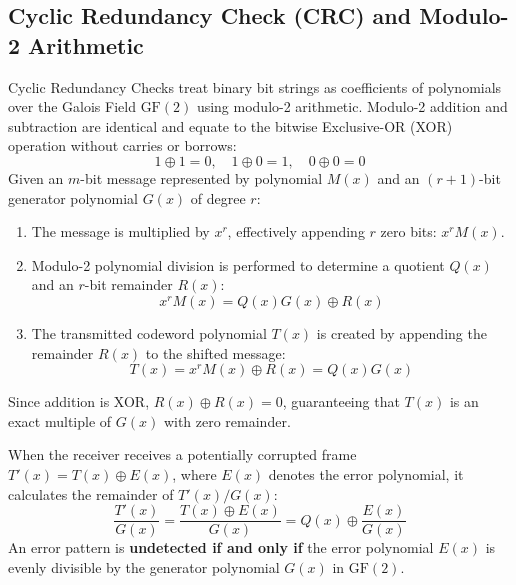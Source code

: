 \documentclass[11pt,a4paper]{article}
\begin{document}
\subsection{Cyclic Redundancy Check (CRC) and Modulo-2 Arithmetic}

Cyclic Redundancy Checks treat binary bit strings as coefficients of polynomials over the Galois Field $\text{GF}(2)$ using modulo-2 arithmetic. Modulo-2 addition and subtraction are identical and equate to the bitwise Exclusive-OR (XOR) operation without carries or borrows:
\begin{equation}
    1 \oplus 1 = 0, \quad 1 \oplus 0 = 1, \quad 0 \oplus 0 = 0
\end{equation}
Given an $m$-bit message represented by polynomial $M(x)$ and an $(r+1)$-bit generator polynomial $G(x)$ of degree $r$:
\begin{enumerate}
    \item The message is multiplied by $x^r$, effectively appending $r$ zero bits: $x^r M(x)$.
    \item Modulo-2 polynomial division is performed to determine a quotient $Q(x)$ and an $r$-bit remainder $R(x)$:
    \begin{equation}
        x^r M(x) = Q(x) G(x) \oplus R(x)
    \end{equation}
    \item The transmitted codeword polynomial $T(x)$ is created by appending the remainder $R(x)$ to the shifted message:
    \begin{equation}
        T(x) = x^r M(x) \oplus R(x) = Q(x) G(x)
    \end{equation}
\end{enumerate}
Since addition is XOR, $R(x) \oplus R(x) = 0$, guaranteeing that $T(x)$ is an exact multiple of $G(x)$ with zero remainder.

When the receiver receives a potentially corrupted frame $T'(x) = T(x) \oplus E(x)$, where $E(x)$ denotes the error polynomial, it calculates the remainder of $T'(x) / G(x)$:
\begin{equation}
    \frac{T'(x)}{G(x)} = \frac{T(x) \oplus E(x)}{G(x)} = Q(x) \oplus \frac{E(x)}{G(x)}
\end{equation}
An error pattern is \textbf{undetected if and only if} the error polynomial $E(x)$ is evenly divisible by the generator polynomial $G(x)$ in $\text{GF}(2)$.
\end{document}

